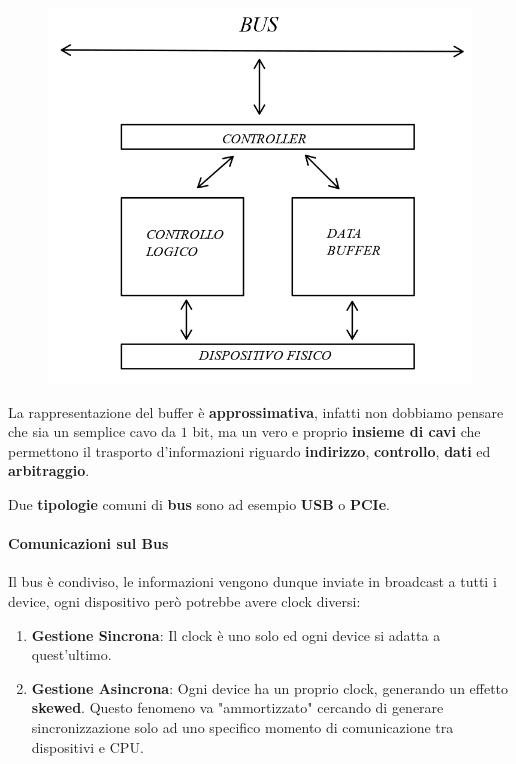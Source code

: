 \documentclass{article}
\begin{document}
\begin{figure}[htbp]
    \center
    \includegraphics[scale=0.4]{img/device_io1.png}
\end{figure}

La rappresentazione del buffer è \textbf{approssimativa}, infatti non dobbiamo pensare che sia un semplice cavo da $1$ bit, ma un vero e proprio \textbf{insieme di cavi} che permettono il trasporto d'informazioni riguardo \textbf{indirizzo}, \textbf{controllo}, \textbf{dati} ed \textbf{arbitraggio}.

Due \textbf{tipologie} comuni di \textbf{bus} sono ad esempio \textbf{USB} o \textbf{PCIe}.

\vspace*{15px}

\paragraph{Comunicazioni sul Bus} Il bus è condiviso, le informazioni vengono dunque inviate in broadcast a tutti i device, ogni dispositivo però potrebbe avere clock diversi:

\begin{enumerate}
    \item \textbf{Gestione Sincrona}: Il clock è uno solo ed ogni device si adatta a quest'ultimo.
    \item \textbf{Gestione Asincrona}: Ogni device ha un proprio clock, generando un effetto \textbf{skewed}. Questo fenomeno va "ammortizzato" cercando di generare sincronizzazione solo ad uno specifico momento di comunicazione tra dispositivi e CPU.
\end{enumerate}
\end{document}

